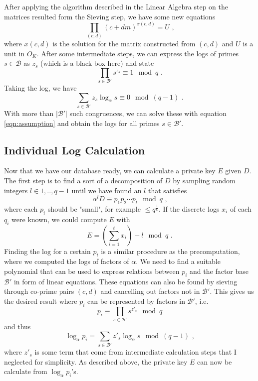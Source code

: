 \documentclass[paper=a4, fontsize=11pt]{scrartcl} %
\numberwithin{equation}{section} %
\numberwithin{figure}{section} %
\numberwithin{table}{section} %
\begin{document}
After applying the algorithm described in the Linear Algebra step on the matrices resulted form the Sieving step, we have some new equations
\begin{equation}
\prod_{(c,d)}(c+dm)^{x(c,d)} = U
\textit{ ,}
\end{equation}
where $x(c,d)$ is the solution for the matrix constructed from $(c,d)$ and $U$ is a unit in $O_K$. After some intermediate steps, we can express the logs of primes $s\in\mathcal{B}$ as $z_s$ (which is a black box here) and state
\begin{equation}
\prod_{s\in\mathcal{B}'}s^{z_s}\equiv 1\mod q
\text{ .}
\end{equation}
Taking the log, we have
\begin{equation}
\sum_{s\in\mathcal{B}'}z_s\log_\alpha s \equiv 0 \mod (q-1)
\text{ .}
\end{equation}
With more than $|\mathcal{B}'|$ such congruences, we can solve these with equation \ref{eqn:assumption} and obtain the logs for all primes $s\in\mathcal{B}'$.

\subsection{Individual Log Calculation}
\label{subsec:indiviualLogCalculation}
Now that we have our database ready, we can calculate a private key $E$ given $D$. The first step is to find a sort of a decomposition of $D$ by sampling random integers $l\in{1,..,q-1}$ until we have found an $l$ that satisfies
\begin{equation}
\alpha^lD\equiv p_1p_2\cdots p_t\mod q
\text{ ,}
\end{equation}
where each $p_i$ should be "small", for example $\leq q^\frac{1}{k}$. If the discrete logs $x_i$ of each $q_i$ were known, we could compute $E$ with
\begin{equation}
E = \left(\sum_{i=1}^{t}x_i\right)-l \mod q
\text{ .}
\end{equation}
Finding the log for a certain $p_i$ is a similar procedure as the precomputation, where we computed the logs of factors of $\alpha$. We need to find a suitable polynomial that can be used to express relations between $p_i$ and the factor base $\mathcal{B}'$ in form of linear equations. These equations can also be found by sieving through co-prime pairs $(c,d)$ and cancelling out factors not in $\mathcal{B}'$. This gives us the desired result where $p_i$ can be represented by factors in $\mathcal{B}'$, i.e.
\begin{equation}
p_i \equiv \prod_{s\in\mathcal{B}'}s^{z'_s} \mod q
\end{equation}
and thus
\begin{equation}
\log_{\alpha}p_i = \sum_{s\in\mathcal{B}'}z'_s\log_{\alpha}s \mod (q-1)
\text{ ,}
\end{equation}
where $z'_s$ is some term that come from intermediate calculation steps that I neglected for simplicity. As described above, the private key $E$ can now be calculate from $\log_{\alpha}p_i$'s.
\end{document}
